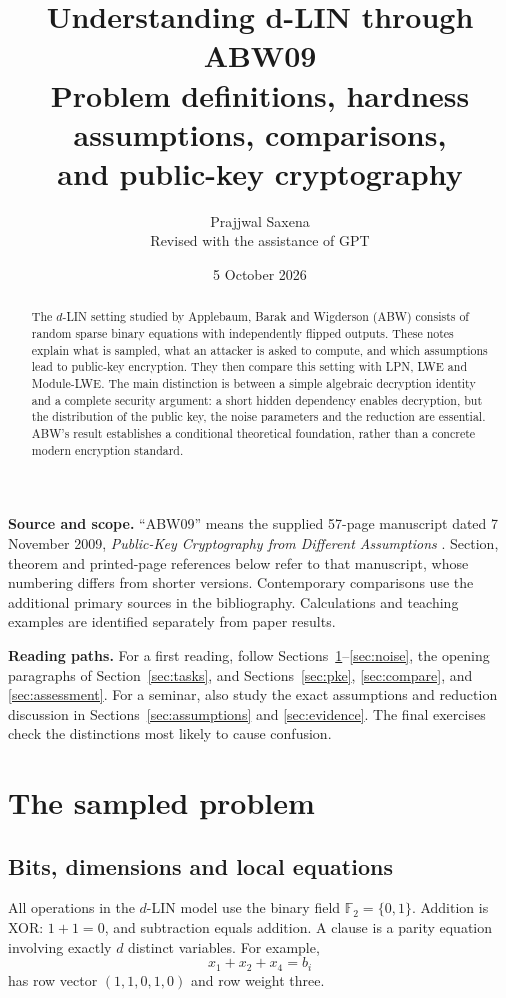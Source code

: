\documentclass[11pt,a4paper]{article}
\title{\textbf{Understanding d-LIN through ABW09}\\[5pt]
\large Problem definitions, hardness assumptions, comparisons,\\and public-key cryptography}
\author{Prajjwal Saxena\\\small Revised with the assistance of GPT}
\date{5 October 2026}
\newcommand{\F}{\mathbb F}
\begin{document}
\maketitle
\begin{abstract}
The $d$-LIN setting studied by Applebaum, Barak and Wigderson (ABW) consists of random sparse binary equations with independently flipped outputs. These notes explain what is sampled, what an attacker is asked to compute, and which assumptions lead to public-key encryption. They then compare this setting with LPN, LWE and Module-LWE. The main distinction is between a simple algebraic decryption identity and a complete security argument: a short hidden dependency enables decryption, but the distribution of the public key, the noise parameters and the reduction are essential. ABW's result establishes a conditional theoretical foundation, rather than a concrete modern encryption standard.
\end{abstract}

\textbf{Source and scope.} ``ABW09'' means the supplied 57-page manuscript dated 7 November 2009, \emph{Public-Key Cryptography from Different Assumptions} \cite{abw}. Section, theorem and printed-page references below refer to that manuscript, whose numbering differs from shorter versions. Contemporary comparisons use the additional primary sources in the bibliography. Calculations and teaching examples are identified separately from paper results.

\textbf{Reading paths.} For a first reading, follow Sections~\ref{sec:model}--\ref{sec:noise}, the opening paragraphs of Section~\ref{sec:tasks}, and Sections~\ref{sec:pke}, \ref{sec:compare}, and \ref{sec:assessment}. For a seminar, also study the exact assumptions and reduction discussion in Sections~\ref{sec:assumptions} and \ref{sec:evidence}. The final exercises check the distinctions most likely to cause confusion.
\tableofcontents
\newpage

\section{The sampled problem}\label{sec:model}
\subsection{Bits, dimensions and local equations}
All operations in the $d$-LIN model use the binary field $\F_2=\{0,1\}$. Addition is XOR: $1+1=0$, and subtraction equals addition. A clause is a parity equation involving exactly $d$ distinct variables. For example,
\[
 x_1+x_2+x_4=b_i
\]
has row vector $(1,1,0,1,0)$ and row weight three.
\end{document}
